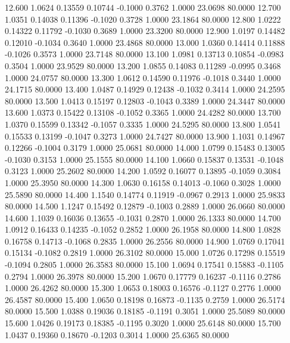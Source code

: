   12.600   1.0624   0.13559   0.10744  -0.1000   0.3762   1.0000  23.0698  80.0000
  12.700   1.0351   0.14038   0.11396  -0.1020   0.3728   1.0000  23.1864  80.0000
  12.800   1.0222   0.14322   0.11792  -0.1030   0.3689   1.0000  23.3200  80.0000
  12.900   1.0197   0.14482   0.12010  -0.1034   0.3640   1.0000  23.4868  80.0000
  13.000   1.0360   0.14414   0.11888  -0.1026   0.3573   1.0000  23.7148  80.0000
  13.100   1.0981   0.13713   0.10854  -0.0983   0.3504   1.0000  23.9529  80.0000
  13.200   1.0855   0.14083   0.11289  -0.0995   0.3468   1.0000  24.0757  80.0000
  13.300   1.0612   0.14590   0.11976  -0.1018   0.3440   1.0000  24.1715  80.0000
  13.400   1.0487   0.14929   0.12438  -0.1032   0.3414   1.0000  24.2595  80.0000
  13.500   1.0413   0.15197   0.12803  -0.1043   0.3389   1.0000  24.3447  80.0000
  13.600   1.0373   0.15422   0.13108  -0.1052   0.3365   1.0000  24.4282  80.0000
  13.700   1.0370   0.15599   0.13342  -0.1057   0.3335   1.0000  24.5295  80.0000
  13.800   1.0541   0.15533   0.13199  -0.1047   0.3273   1.0000  24.7427  80.0000
  13.900   1.1031   0.14967   0.12266  -0.1004   0.3179   1.0000  25.0681  80.0000
  14.000   1.0799   0.15483   0.13005  -0.1030   0.3153   1.0000  25.1555  80.0000
  14.100   1.0660   0.15837   0.13531  -0.1048   0.3123   1.0000  25.2602  80.0000
  14.200   1.0592   0.16077   0.13895  -0.1059   0.3084   1.0000  25.3950  80.0000
  14.300   1.0630   0.16158   0.14013  -0.1060   0.3028   1.0000  25.5890  80.0000
  14.400   1.1540   0.14774   0.11919  -0.0967   0.2913   1.0000  25.9833  80.0000
  14.500   1.1247   0.15492   0.12879  -0.1003   0.2889   1.0000  26.0660  80.0000
  14.600   1.1039   0.16036   0.13655  -0.1031   0.2870   1.0000  26.1333  80.0000
  14.700   1.0912   0.16433   0.14235  -0.1052   0.2852   1.0000  26.1958  80.0000
  14.800   1.0828   0.16758   0.14713  -0.1068   0.2835   1.0000  26.2556  80.0000
  14.900   1.0769   0.17041   0.15134  -0.1082   0.2819   1.0000  26.3102  80.0000
  15.000   1.0726   0.17298   0.15519  -0.1094   0.2805   1.0000  26.3583  80.0000
  15.100   1.0694   0.17541   0.15883  -0.1105   0.2794   1.0000  26.3978  80.0000
  15.200   1.0670   0.17779   0.16237  -0.1116   0.2786   1.0000  26.4262  80.0000
  15.300   1.0653   0.18003   0.16576  -0.1127   0.2776   1.0000  26.4587  80.0000
  15.400   1.0650   0.18198   0.16873  -0.1135   0.2759   1.0000  26.5174  80.0000
  15.500   1.0388   0.19036   0.18185  -0.1191   0.3051   1.0000  25.5089  80.0000
  15.600   1.0426   0.19173   0.18385  -0.1195   0.3020   1.0000  25.6148  80.0000
  15.700   1.0437   0.19360   0.18670  -0.1203   0.3014   1.0000  25.6365  80.0000
